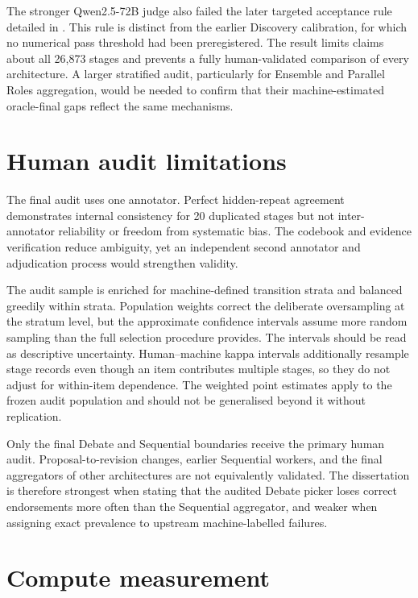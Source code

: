 The stronger Qwen2.5-72B judge also failed the later targeted acceptance rule detailed in . This rule is distinct from the earlier Discovery calibration, for which no numerical pass threshold had been preregistered. The result limits claims about all 26,873 stages and prevents a fully human-validated comparison of every architecture. A larger stratified audit, particularly for Ensemble and Parallel Roles aggregation, would be needed to confirm that their machine-estimated oracle-final gaps reflect the same mechanisms.

\section{Human audit limitations}

The final audit uses one annotator. Perfect hidden-repeat agreement demonstrates internal consistency for 20 duplicated stages but not inter-annotator reliability or freedom from systematic bias. The codebook and evidence verification reduce ambiguity, yet an independent second annotator and adjudication process would strengthen validity.

The audit sample is enriched for machine-defined transition strata and balanced greedily within strata. Population weights correct the deliberate oversampling at the stratum level, but the approximate confidence intervals assume more random sampling than the full selection procedure provides. The intervals should be read as descriptive uncertainty. Human--machine kappa intervals additionally resample stage records even though an item contributes multiple stages, so they do not adjust for within-item dependence. The weighted point estimates apply to the frozen audit population and should not be generalised beyond it without replication.

Only the final Debate and Sequential boundaries receive the primary human audit. Proposal-to-revision changes, earlier Sequential workers, and the final aggregators of other architectures are not equivalently validated. The dissertation is therefore strongest when stating that the audited Debate picker loses correct endorsements more often than the Sequential aggregator, and weaker when assigning exact prevalence to upstream machine-labelled failures.

\section{Compute measurement}

